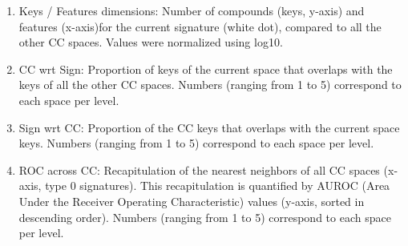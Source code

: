 \begin{enumerate}
    \item[\textbullet]Keys / Features dimensions: Number of compounds (keys, y-axis) and features (x-axis)for the current signature (white dot), compared to all the other CC spaces. Values were normalized using log10.
    \item[\textbullet]CC wrt Sign: Proportion of keys of the current space that overlaps with the keys of all the other CC spaces. Numbers (ranging from 1 to 5) correspond to each space per level.
    \item[\textbullet]Sign wrt CC: Proportion of the CC keys that overlaps with the current space keys. Numbers (ranging from 1 to 5) correspond to each space per level.
    \item[\textbullet]ROC across CC: Recapitulation of the nearest neighbors of all CC spaces (x-axis, type 0 signatures). This recapitulation is quantified by AUROC (Area Under the Receiver Operating Characteristic) values (y-axis, sorted in descending order). Numbers (ranging from 1 to 5) correspond to each space per level.
\end{enumerate}

